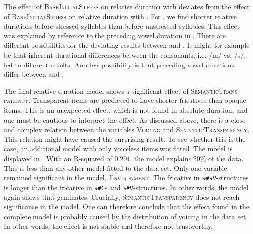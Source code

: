 The effect of \textsc{BaseInitialStress} on relative duration with  deviates from the effect of \textsc{BaseInitialStress} on relative duration with . For , we find shorter relative durations before stressed syllables than before unstressed syllables. This effect was explained by reference to the preceding vowel duration in . There are different possibilities for the deviating results between  and . It might for example be that inherent durational differences between the consonants, i.e. /m/ vs. /s/, led to different results. Another possibility is that preceding vowel durations differ between  and .
          

 The final relative duration model shows a significant effect of \textsc{SemanticTrans-parency}. Transparent items are predicted to have shorter fricatives than opaque items. This is an unexpected effect, which is not found in absolute duration, and one must be cautious to interpret the effect. 
 As discussed above, there is a close and complex relation between the variables \textsc{Voicing} and \textsc{SemanticTransparency}. This relation might have caused the surprising result. To see whether this is the case, an additional model with only voiceless items was fitted. The model is displayed in .
 With an R-squared of $0.204$, the model explains 20\% of the data. This is less than any other model fitted to the data set. Only one variable remained significant in the model, \textsc{Environment}. The fricative in \texttt{s\#sV}-structures is longer than the fricative in \texttt{s\#C}- and \texttt{s\#V}-structures. In other words, the model again shows that  geminates. 
 Crucially, \textsc{SemanticTransparency} does not reach significance in the model. One can therefore conclude that the effect found in the complete model is probably caused by the distribution of voicing in the data set. In other words, the effect is not stable and therefore not trustworthy.

